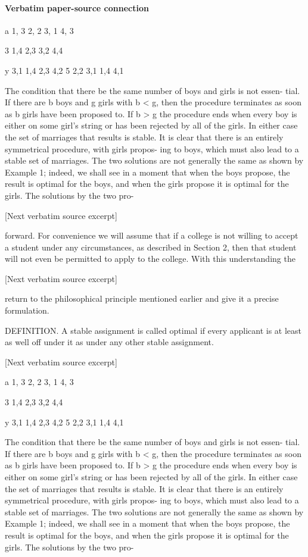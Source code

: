 \documentclass[10pt]{article}
\begin{document}
\paragraph{Verbatim paper-source connection}
\begin{ReviewVerbatim}
a 1, 3 2, 2 3, 1 4, 3

                             3 1,4 2,3 3,2 4,4

                            y 3,1 1,4 2,3 4,2
                            5 2,2 3,1 1,4 4,1


   The condition that there be the same number of boys and girls is not essen-
tial. If there are b boys and g girls with b < g, then the procedure terminates as
soon as b girls have been proposed to. If b > g the procedure ends when every
boy is either on some girl's string or has been rejected by all of the girls. In
either case the set of marriages that results is stable.
   It is clear that there is an entirely symmetrical procedure, with girls propos-
ing to boys, which must also lead to a stable set of marriages. The two solutions
are not generally the same as shown by Example 1; indeed, we shall see in a
moment that when the boys propose, the result is optimal for the boys, and
when the girls propose it is optimal for the girls. The solutions by the two pro-

[Next verbatim source excerpt]

forward. For convenience we will assume that if a college is not willing to accept
a student under any circumstances, as described in Section 2, then that student
will not even be permitted to apply to the college. With this understanding the

[Next verbatim source excerpt]

return to the philosophical principle mentioned earlier and give it a precise
formulation.

   DEFINITION. A stable assignment is called optimal if every applicant is at least
as well off under it as under any other stable assignment.


[Next verbatim source excerpt]

                            a 1, 3 2, 2 3, 1 4, 3

                             3 1,4 2,3 3,2 4,4

                            y 3,1 1,4 2,3 4,2
                            5 2,2 3,1 1,4 4,1


   The condition that there be the same number of boys and girls is not essen-
tial. If there are b boys and g girls with b < g, then the procedure terminates as
soon as b girls have been proposed to. If b > g the procedure ends when every
boy is either on some girl's string or has been rejected by all of the girls. In
either case the set of marriages that results is stable.
   It is clear that there is an entirely symmetrical procedure, with girls propos-
ing to boys, which must also lead to a stable set of marriages. The two solutions
are not generally the same as shown by Example 1; indeed, we shall see in a
moment that when the boys propose, the result is optimal for the boys, and
when the girls propose it is optimal for the girls. The solutions by the two pro-


\end{ReviewVerbatim}
\end{document}

